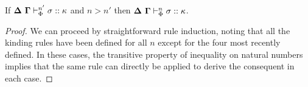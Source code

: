 \documentclass{llncs}
\begin{document}
\begin{lemma}
If $\boldsymbol\Delta~\boldsymbol\Gamma \vdash_{\Phi}^{n'} \sigma :: \kappa$ and $n > n'
$ then $\boldsymbol\Delta~\boldsymbol\Gamma \vdash_{\Phi}^{n} \sigma :: \kappa$.
\end{lemma}
\begin{proof}
We can proceed by straightforward rule induction, noting that all the kinding rules  have been defined for all $n$ except for the four most recently defined. In these cases, the transitive property of inequality on natural numbers implies that the same rule can directly be applied to derive the consequent in each  case.
\end{proof}

\end{document}
